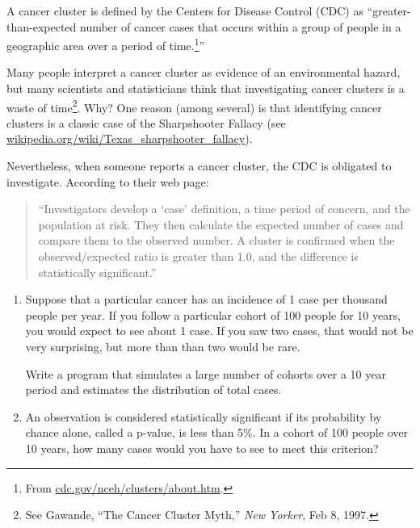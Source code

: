\documentclass[12pt]{book}
\begin{document}
\begin{exercise}
A cancer cluster is defined by the Centers for Disease Control (CDC)
as ``greater-than-expected number of cancer cases that occurs within a
group of people in a geographic area over a period of
time.\footnote{From \url{cdc.gov/nceh/clusters/about.htm}.}''

Many people interpret a cancer cluster as evidence of an environmental
hazard, but many scientists and statisticians think that investigating
cancer clusters is a waste of time\footnote{See Gawande, ``The Cancer
  Cluster Myth,'' {\em New Yorker}, Feb 8, 1997.}.  Why?  One reason
(among several) is that identifying cancer clusters is a classic case
of the Sharpshooter Fallacy (see
\url{wikipedia.org/wiki/Texas_sharpshooter_fallacy}).

Nevertheless, when someone reports a cancer cluster, the CDC is
obligated to investigate.  According to their web page:

\begin{quote}

``Investigators develop a `case' definition, a time period of concern,
  and the population at risk. They then calculate the expected number
  of cases and compare them to the observed number. A cluster is
  confirmed when the observed/expected ratio is greater than 1.0, and
  the difference is statistically significant.''

\end{quote}

\begin{enumerate}

\item Suppose that a particular cancer has an incidence of 1 case per
  thousand people per year.  If you follow a particular cohort of 100
  people for 10 years, you would expect to see about 1 case.  If you
  saw two cases, that would not be very surprising, but more than than
  two would be rare.

  Write a program that simulates a large number of cohorts over
  a 10 year period and estimates the distribution of total cases.

\item An observation is considered statistically significant if its
  probability by chance alone, called a p-value, is less than 5\%.
  In a cohort of 100 people over 10 years, how many cases would you
  have to see to meet this criterion?


\end{enumerate}
\end{exercise}
\end{document}
